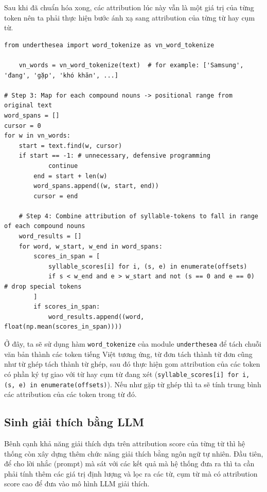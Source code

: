 Sau khi đã chuẩn hóa xong, các attribution lúc này vẫn là một giá trị của từng token nên ta phải thực hiện bước ánh xạ sang attribution của từng từ hay cụm từ.
\begin{lstlisting}[style=pythoncode]
from underthesea import word_tokenize as vn_word_tokenize

    vn_words = vn_word_tokenize(text)  # for example: ['Samsung', 'đang', 'gặp', 'khó khăn', ...]

# Step 3: Map for each compound nouns -> positional range from original text
word_spans = []
cursor = 0
for w in vn_words:
    start = text.find(w, cursor)
    if start == -1: # unnecessary, defensive programming
            continue
        end = start + len(w)
        word_spans.append((w, start, end))
        cursor = end

    # Step 4: Combine attribution of syllable-tokens to fall in range of each compound nouns
    word_results = []
    for word, w_start, w_end in word_spans:
        scores_in_span = [
            syllable_scores[i] for i, (s, e) in enumerate(offsets)
            if s < w_end and e > w_start and not (s == 0 and e == 0)  # drop special tokens
        ]
        if scores_in_span:
            word_results.append((word, float(np.mean(scores_in_span))))
\end{lstlisting}
Ở đây, ta sẽ sử dụng hàm \texttt{word\_tokenize} của module \texttt{underthesea} để tách chuỗi văn bản thành các token tiếng Việt tương ứng, từ đơn
tách thành từ đơn cũng như từ ghép tách thành từ ghép, sau đó thực hiện gom attribution của các token có phần ký tự giao với từ hay cụm từ đang xét 
(\texttt{syllable\_scores[i] for i, (s, e) in enumerate(offsets)}). Nếu như gặp từ ghép thì ta sẽ tính trung bình các attribution của các token trong từ đó.

\subsection{Sinh giải thích bằng LLM}
Bênh cạnh khả năng giải thích dựa trên attribution score của từng từ thì hệ thống còn xây dựng thêm chức năng giải thích bằng ngôn ngữ tự nhiên. Đầu tiên, để cho lời
nhắc (prompt) mà sát với các kết quả mà hệ thống đưa ra thì ta cần phải tính thêm các giá trị định lượng và lọc ra các từ, cụm từ mà có attribution score cao để đưa vào 
mô hình LLM giải thích.

